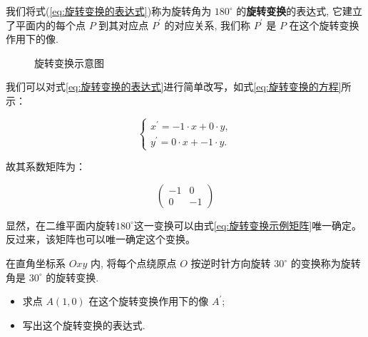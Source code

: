 我们将式(\ref{eq:旋转变换的表达式})称为旋转角为 $180^{\circ}$ 的\textcolor{third}{\bf 旋转变换}的表达式, 它建立了平面内的每个点 $P$ 到其对应点 $P^{\prime}$ 的对应关系, 我们称 $P^{\prime}$ 是 $P$ 在这个旋转变换作用下的像.

\begin{figure}[h]
\centering
{}
\caption{旋转变换示意图\label{fig:旋转变换}}
\end{figure}

我们可以对式\ref{eq:旋转变换的表达式}进行简单改写，如式\ref{eq:旋转变换的方程}所示：

\begin{equation}
\left\{\begin{array}{l}
x^{\prime}=-1 \cdot x + 0\cdot y, \\
y^{\prime}= 0\cdot x + -1 \cdot y .
\end{array}\right.
\label{eq:旋转变换的方程}
\end{equation}

故其系数矩阵为：

\begin{equation}
\left(\begin{array}{rr}
-1  & 0 \\
0  & -1
\end{array}\right)
\label{eq:旋转变换示例矩阵}
\end{equation}

显然，在二维平面内旋转$180^{\circ}$这一变换可以由式\ref{eq:旋转变换示例矩阵}唯一确定。反过来，该矩阵也可以唯一确定这个变换。

\begin{exercise}
 
在直角坐标系 $O x y$ 内, 将每个点绕原点 $O$ 按逆时针方向旋转 $30^{\circ}$ 的变换称为旋转角是 $30^{\circ}$ 的旋转变换.

\vspace{0.5cm}

\begin{itemize}
    \item 求点 $A(1,0)$ 在这个旋转变换作用下的像 $A^{\prime}$;
    \item 写出这个旋转变换的表达式.
\end{itemize}
\end{exercise}


